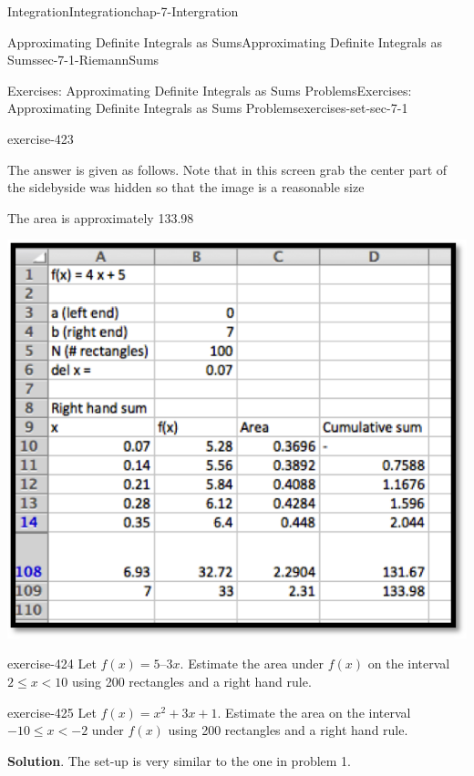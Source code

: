 \documentclass[oneside,10pt,]{book}
\numberwithin{equation}{section}
\newcommand{\lt}{<}
\begin{document}
\begin{chapterptx}{Integration}{}{Integration}{}{}{chap-7-Intergration}
\begin{sectionptx}{Approximating Definite Integrals as Sums}{}{Approximating Definite Integrals as Sums}{}{}{sec-7-1-RiemannSums}
\begin{exercises-subsection-numberless}{Exercises: Approximating Definite Integrals as Sums Problems}{}{Exercises: Approximating Definite Integrals as Sums Problems}{}{}{exercises-set-sec-7-1}
\begin{divisionexercise}{1}{}{}{exercise-423}
\begin{sidebyside}{1}{0}{0}{0}
\begin{sbspanel}{1}
\end{sbspanel}%
\end{sidebyside}%
\par
\hypertarget{p-2573}{}%
The answer is given as follows. Note that in this screen grab the center part of the sidebyside was hidden so that the image is a reasonable size%
\par
\hypertarget{p-2574}{}%
The area is approximately 133.98%
\begin{sidebyside}{1}{0.2}{0.2}{0}%
\begin{sbspanel}{0.6}%
\includegraphics[width=1\linewidth]{images/sec7-1-sol1b.png}
\end{sbspanel}%
\end{sidebyside}%
\end{divisionexercise}%
\begin{divisionexercise}{2}{}{}{exercise-424}%
\hypertarget{p-2575}{}%
Let \(f(x) = 5 – 3 x\).  Estimate the area under \(f(x)\) on the interval \(2 \le  x \lt 10\) using 200 rectangles and a right hand rule.%
\end{divisionexercise}%
\begin{divisionexercise}{3}{}{}{exercise-425}%
\hypertarget{p-2576}{}%
Let \(f(x) = x^2  + 3 x + 1\).  Estimate the area on the interval \(-10\le  x \lt -2\) under \(f(x)\) using 200 rectangles and a right hand rule.%
\par\smallskip%
\noindent\textbf{Solution}.\hypertarget{solution-215}{}\quad%
\hypertarget{p-2577}{}%
The set-up is very similar to the one in problem 1.%

\end{divisionexercise}
\end{exercises-subsection-numberless}
\end{sectionptx}
\end{chapterptx}
\end{document}
